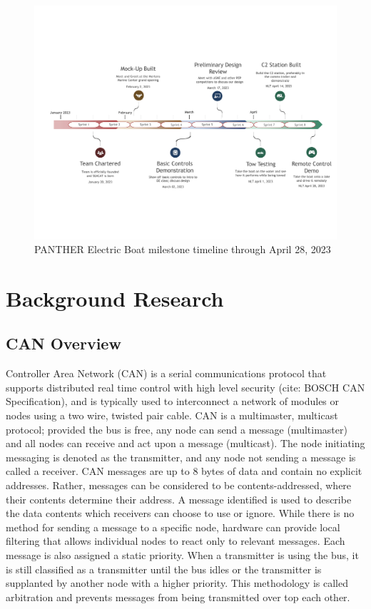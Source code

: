 \documentclass[12pt]{article}
\begin{document}
\begin{figure}[!h]
    \centering
    \includegraphics[width=\textwidth+0.5in]{images/02-2023/PANTHER Timeline.pdf}
    \caption{PANTHER Electric Boat milestone timeline through April 28, 2023}
    \label{fig:milestone_timeline}
\end{figure}
\pagebreak

\section{Background Research}
\subsection{CAN Overview} %
Controller Area Network (CAN) is a serial communications protocol that supports distributed real time control with high level security (cite: BOSCH CAN Specification), and is typically used to interconnect a network of modules or nodes using a two wire, twisted pair cable. 
CAN is a multimaster, multicast protocol; provided the bus is free, any node can send a message (multimaster) and all nodes can receive and act upon a message (multicast). 
The node initiating messaging is denoted as the transmitter, and any node not sending a message is called a receiver. 
CAN messages are up to 8 bytes of data and contain no explicit addresses. 
Rather, messages can be considered to be contents-addressed, where their contents determine their address. 
A message identified is used to describe the data contents which receivers can choose to use or ignore. 
While there is no method for sending a message to a specific node, hardware can provide local filtering that allows individual nodes to react only to relevant messages.
Each message is also assigned a static priority.
When a transmitter is using the bus, it is still classified as a transmitter until the bus idles or the transmitter is supplanted by another node with a higher priority.
This methodology is called arbitration and prevents messages from being transmitted over top each other.
\end{document}
